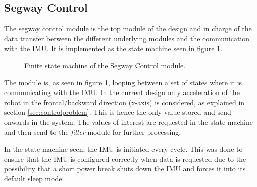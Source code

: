 \subsection{Segway Control}
The segway control module is the top module of the design and in charge of the data transfer between the different underlying modules and the communication with the IMU.
It is implemented as the state machine seen in figure \ref{fig:segwaycontrol_fsm}.


\begin{figure}[H]
\centering


\caption{Finite state machine of the Segway Control module.}
\label{fig:segwaycontrol_fsm}
\end{figure}

The module is, as seen in figure \ref{fig:segwaycontrol_fsm}, looping between a set of states where it is communicating with the IMU.
In the current design only acceleration of the robot in the frontal/backward direction (x-axis) is considered, as explained in section \ref{sec:controlproblem}.
This is hence the only value stored and send onwards in the system.
The values of interest are requested in the state machine and then send to the \textit{filter} module for further processing.

In the state machine seen, the IMU is initiated every cycle.
This was done to ensure that the IMU is configured correctly when data is requested due to the possibility that a short power break shuts down the IMU and forces it into its default sleep mode.

